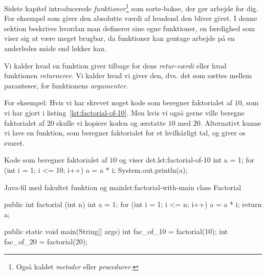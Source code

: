 	Sidste kapitel introducerede \emph{funktioner}\footnote{Også kaldet \emph{metoder} eller \emph{procedurer}.}
	som sorte-bokse, der gør arbejde for dig. For eksempel 
	som giver den absolutte værdi af hvadend den bliver givet. I denne sektion
	beskrives hvordan man definerer sine egne funktioner, en færdighed som viser
	sig at være meget brugbar, da funktioner kan gentage arbejde på en
	anderledes måde end løkker kan.

	Vi kalder hvad en funktion giver tilbage for dens \emph{retur-værdi} eller
	hvad funktionen \emph{returnerer}. Vi kalder hvad vi giver den, dvs. det som
	sættes mellem paranteser, for funktionens \emph{argumenter}.



\iffalse%

	For eksempel: Hvis vi har skrevet noget kode som beregner faktorialet af
	\(10\), som vi har gjort i listing~\ref{lst:factorial-of-10}. Men hvis vi
	også gerne ville beregne faktorialet af \(20\) skulle vi kopiere koden og
	ærstatte \(10\) med \(20\). Alternativt kunne vi lave en funktion, som
	beregner faktorialet for et hvilkårligt tal, og giver os svaret.

	\begin{JavaCode}{Kode som beregner faktorialet af \(10\) og viser det.}{lst:factorial-of-10}
		int a = 1;
		for (int i = 1; i <= 10; i++)
			a = a * i;
		System.out.println(a);
	\end{JavaCode}


	\begin{JavaCode}{Java-fil med fakultet funktion og main}{lst:factorial-with-main}
	class Factorial {

		public int factorial (int n) {
			int a = 1;
			for (int i = 1; i <= n; i++)
				a = a * i;
			return a;
		}

		public static void main(String[] args) {
			int fac_of_10 = factorial(10);
			int fac_of_20 = factorial(20);
		}

	}
	\end{JavaCode}

